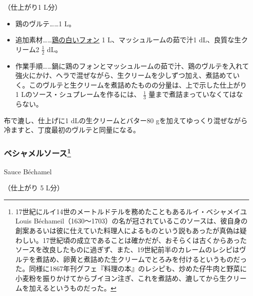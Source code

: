 \begin{recette}
（仕上がり1 L分）

\begin{itemize}
\item
  鶏のヴルテ\ldots{}\ldots{}1 L。
\item
  追加素材\ldots{}\ldots{}\protect\hyperlink{fonds-de-volaille}{鶏の白いフォン}
  1 L、マッシュルームの茹で汁1 dL、良質な生クリーム2 \(\frac{1}{2}\)
  dL。
\item
  作業手順\ldots{}\ldots{}鍋に鶏のフォンとマッシュルームの茹で汁、鶏のヴルテを入れて強火にかけ、ヘラで混ぜながら、生クリームを少しずつ加え、煮詰めていく。このヴルテと生クリームを煮詰めたものの分量は、上で示した仕上がり
  1 Lのソース・シュプレームを作るには、 \(\frac{1}{3}\)
  量まで煮詰まっていなくてはならない。
\end{itemize}

布で漉し、仕上げに1 dLの生クリームとバター80
gを加えてゆっくり混ぜながら冷ますと、丁度最初のヴルテと同量になる。

\atoaki{}

\hypertarget{sauce-bechamel}{%
\subsubsection[ベシャメルソース]{\texorpdfstring{ベシャメルソース\footnote{17世紀にルイ14世のメートルドテルを務めたこともあるルイ・ベシャメイユLouis
  Béchameil（1630〜1703）の名が冠されているこのソースは、彼自身の創案あるいは彼に仕えていた料理人によるものという説もあったが真偽は疑わしい。17世紀頃の成立であることは確かだが、おそらくは古くからあったソースを改良したものに過ぎず、また、19世紀前半のカレームのレシピはヴルテを煮詰め、卵黄と煮詰めた生クリームでとろみを付けるというものだった。同様に1867年刊グフェ『料理の本』のレシピも、炒めた仔牛肉と野菜に小麦粉を振りかけてからブイヨン注ぎ、これを煮詰め、漉してから生クリームを加えるというものだった。}}{ベシャメルソース}}\label{sauce-bechamel}}

\begin{frsubenv}

Sauce Béchamel

\end{frsubenv}

 

（仕上がり 5 L分）


\end{recette}
